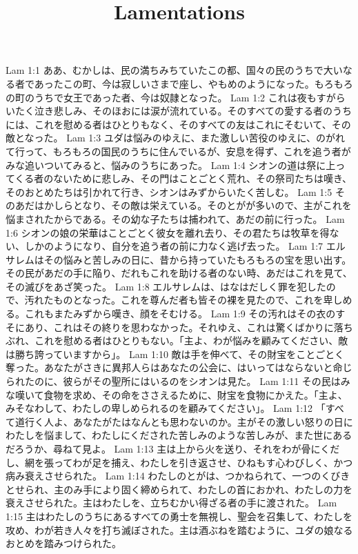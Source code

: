 

\title{Lamentations}

Lam 1:1  ああ、むかしは、民の満ちみちていたこの都、国々の民のうちで大いなる者であったこの町、今は寂しいさまで座し、やもめのようになった。もろもろの町のうちで女王であった者、今は奴隷となった。
Lam 1:2  これは夜もすがらいたく泣き悲しみ、そのほおには涙が流れている。そのすべての愛する者のうちには、これを慰める者はひとりもなく、そのすべての友はこれにそむいて、その敵となった。
Lam 1:3  ユダは悩みのゆえに、また激しい苦役のゆえに、のがれて行って、もろもろの国民のうちに住んでいるが、安息を得ず、これを追う者がみな追いついてみると、悩みのうちにあった。
Lam 1:4  シオンの道は祭に上ってくる者のないために悲しみ、その門はことごとく荒れ、その祭司たちは嘆き、そのおとめたちは引かれて行き、シオンはみずからいたく苦しむ。
Lam 1:5  そのあだはかしらとなり、その敵は栄えている。そのとがが多いので、主がこれを悩まされたからである。その幼な子たちは捕われて、あだの前に行った。
Lam 1:6  シオンの娘の栄華はことごとく彼女を離れ去り、その君たちは牧草を得ない、しかのようになり、自分を追う者の前に力なく逃げ去った。
Lam 1:7  エルサレムはその悩みと苦しみの日に、昔から持っていたもろもろの宝を思い出す。その民があだの手に陥り、だれもこれを助ける者のない時、あだはこれを見て、その滅びをあざ笑った。
Lam 1:8  エルサレムは、はなはだしく罪を犯したので、汚れたものとなった。これを尊んだ者も皆その裸を見たので、これを卑しめる。これもまたみずから嘆き、顔をそむける。
Lam 1:9  その汚れはその衣のすそにあり、これはその終りを思わなかった。それゆえ、これは驚くばかりに落ちぶれ、これを慰める者はひとりもない。「主よ、わが悩みを顧みてください、敵は勝ち誇っていますから」。
Lam 1:10  敵は手を伸べて、その財宝をことごとく奪った。あなたがさきに異邦人らはあなたの公会に、はいってはならないと命じられたのに、彼らがその聖所にはいるのをシオンは見た。
Lam 1:11  その民はみな嘆いて食物を求め、その命をささえるために、財宝を食物にかえた。「主よ、みそなわして、わたしの卑しめられるのを顧みてください」。
Lam 1:12  「すべて道行く人よ、あなたがたはなんとも思わないのか。主がその激しい怒りの日にわたしを悩まして、わたしにくだされた苦しみのような苦しみが、また世にあるだろうか、尋ねて見よ。
Lam 1:13  主は上から火を送り、それをわが骨にくだし、網を張ってわが足を捕え、わたしを引き返させ、ひねもす心わびしく、かつ病み衰えさせられた。
Lam 1:14  わたしのとがは、つかねられて、一つのくびきとせられ、主のみ手により固く締められて、わたしの首におかれ、わたしの力を衰えさせられた。主はわたしを、立ちむかい得ざる者の手に渡された。
Lam 1:15  主はわたしのうちにあるすべての勇士を無視し、聖会を召集して、わたしを攻め、わが若き人々を打ち滅ぼされた。主は酒ぶねを踏むように、ユダの娘なるおとめを踏みつけられた。
